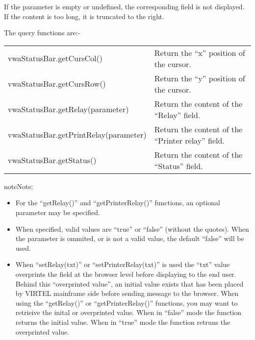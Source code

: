 \documentclass[letterpaper,10pt,english]{sphinxmanual}
\begin{document}
If the parameter is empty or undefined, the corresponding field is not displayed. If the content is too long, it is truncated to the right.

The query functions are:-


\begin{savenotes}\sphinxattablestart
\centering
\begin{tabulary}{\linewidth}[t]{|T|T|}
\hline
{}\relax &\relax \\
\hline
vwaStatusBar.getCursCol()
&
Return the “x” position of the cursor.
\\
\hline
vwaStatusBar.getCursRow()
&
Return the “y” position of the cursor.
\\
\hline
vwaStatusBar.getRelay(parameter)
&
Return the content of the “Relay” field.
\\
\hline
vwaStatusBar.getPrintRelay(parameter)
&
Return the content of the “Printer relay” field.
\\
\hline
vwaStatusBar.getStatus()
&
Return the content of the “Status” field.
\\
\hline
\end{tabulary}
\par
\sphinxattableend\end{savenotes}

\begin{sphinxadmonition}{note}{Note:}\begin{itemize}
\item {} 
For the “getRelay()” and “getPrinterRelay()” functions, an optional parameter may be specified.

\item {} 
When specified, valid values are “true” or “false” (without the quotes). When the parameter is ommited, or is not a valid value, the default “false” will be used.

\item {} 
When “setRelay(txt)” or “setPrinterRelay(txt)” is used the “txt” value overprints the field at the browser level before displaying to the end user. Behind this “overprinted value”, an initial value exists that has been placed by VIRTEL mainframe side before sending message to the browser. When using the “getRelay()” or “getPrinterRelay()” functions, you may want to retrieive the inital or overprinted value. When in “false” mode the function returns the initial value. When in “true” mode the function retruns the overprinted value.

\end{itemize}
\end{sphinxadmonition}
\end{document}

